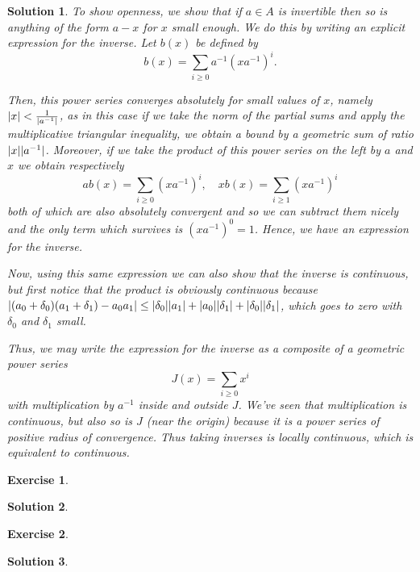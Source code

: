 \documentclass{article}
\newtheorem{ex}{Exercise}
\theoremstyle{nonumberplain}
\newtheorem{sol}{Solution}
\DeclarePairedDelimiter{\norm}{\lvert}{\rvert}
\begin{document}
\begin{sol}
To show openness, we show that if $a \in A$ is invertible then so is anything of the form $a - x$ for $x$ small enough. We do this by writing an explicit expression for the inverse. Let $b(x)$ be defined by
\begin{equation}
b(x) = \sum_{i \geq 0} a^{-1} (x a^{-1})^i.
\end{equation}

Then, this power series converges absolutely for small values of $x$, namely $\norm{x} < \frac1{\norm{a^{-1}}}$, as in this case if we take the norm of the partial sums and apply the multiplicative triangular inequality, we obtain a bound by a geometric sum of ratio $\norm x \norm{a^{-1}}$. Moreover, if we take the product of this power series on the left by $a$ and $x$ we obtain respectively
\begin{equation}
a b(x) = \sum_{i \geq 0} (x a^{-1})^i, \quad x b(x) = \sum_{i \geq 1} (x a^{-1})^i
\end{equation}
both of which are also absolutely convergent and so we can subtract them nicely and the only term which survives is $(x a^{-1})^0 = 1$. Hence, we have an expression for the inverse.

Now, using this same expression we can also show that the inverse is continuous, but first notice that the product is obviously continuous because $\norm{(a_0 + \delta_0)(a_1 + \delta_1) - a_0 a_1} \leq \norm{\delta_0} \norm{a_1} + \norm{a_0} \norm{\delta_1} + \norm{\delta_0} \norm{\delta_1}$, which goes to zero with $\delta_0$ and $\delta_1$ small.

Thus, we may write the expression for the inverse as a composite of a geometric power series
\begin{equation}
J(x) = \sum_{i \geq 0} x^i
\end{equation}
with multiplication by $a^{-1}$ inside and outside $J$. We've seen that multiplication is continuous, but also so is $J$ (near the origin) because it is a power series of positive radius of convergence. Thus taking inverses is locally continuous, which is equivalent to continuous.
\end{sol}

\begin{ex}
\end{ex}

\begin{sol}
\end{sol}

\begin{ex}
\end{ex}

\begin{sol}
\end{sol}
\end{document}
